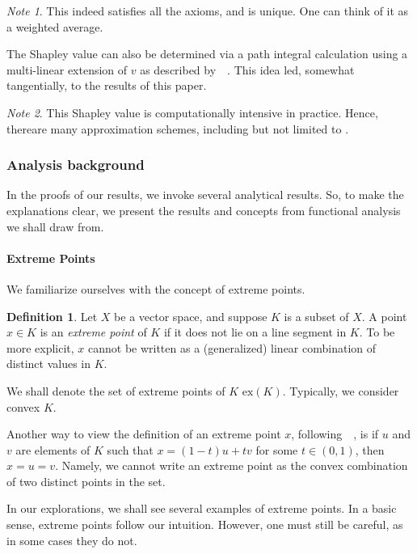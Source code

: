\documentclass[12pt,letterpaper,final]{article}
\theoremstyle{plain}
\theoremstyle{plain}
\theoremstyle{plain}
\theoremstyle{plain}
\theoremstyle{plain}
\theoremstyle{plain}
\theoremstyle{plain}
\theoremstyle{definition}
\newtheorem{definition}{Definition}[section]
\theoremstyle{definition}
\theoremstyle{definition}
\theoremstyle{definition}
\theoremstyle{definition}
\theoremstyle{remark}
\theoremstyle{remark}
\newtheorem*{note}{Note}
\theoremstyle{remark}
\theoremstyle{remark}
\begin{document}
\begin{note}
  This indeed satisfies all the axioms, and is unique.
  One can think of it as a weighted average.
\end{note}

The Shapley value can also be determined via a path integral
calculation using a multi-linear extension of \(v\) as described
by~\citeauthor{Owen72}~\cite{Owen72}. This idea led, somewhat
tangentially, to the results of this paper.

\begin{note}
  This Shapley value is computationally intensive in practice. Hence,
  thereare many approximation schemes, including but not limited to
  \cite{Castro09,Fatima08,Owen72}.
\end{note}

\subsubsection{Analysis background}

In the proofs of our results, we invoke several analytical results. So,
to make the explanations clear, we present the results and
concepts from functional analysis we shall draw from.

\paragraph{Extreme Points}

We familiarize ourselves with the concept of extreme points.

\begin{definition}
  Let \(X\) be a vector space, and suppose \(K\) is a subset of   \(X\). A point \(x\in K\) is an \emph{extreme point} of \(K\) if it
  does not lie on a line segment in \(K\). To be more explicit, \(x\)
  cannot be written as a (generalized) linear combination of distinct
  values in \(K\). 
\end{definition}

We shall denote the set of extreme points of \(K\)
\(\text{ex}(K)\). Typically, we consider convex \(K\). 

Another way to view the definition of an extreme point \(x\),
following~\citeauthor{Bowers14}~\cite{Bowers14}, is if \(u\) and \(v\)
are elements of \(K\)
such that \(x=(1-t)u+tv\) for some \(t\in(0,1)\), then
\(x=u=v\). Namely, we cannot write an extreme point as the convex
combination of two distinct points in the set.

In our explorations, we shall see several examples of extreme
points. In a basic sense, extreme points follow our
intuition. However, one must still be careful, as in some cases they
do not.
\end{document}
